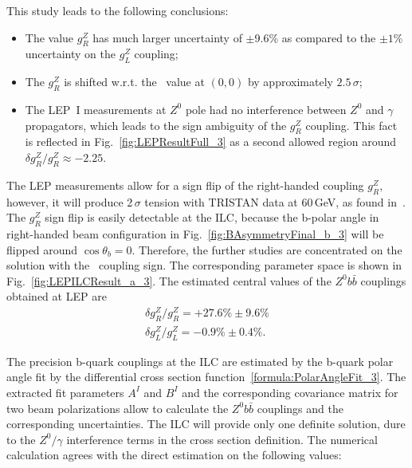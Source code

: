 This study leads to the following conclusions:
\begin{itemize}
	\item The value $g_R^Z$ has much larger uncertainty of $\pm$9.6\% as compared to the $\pm 1$\% uncertainty on the $g_L^Z$ coupling;
	\item The $g_R^Z$ is shifted w.r.t. the \sm\ value at $(0,0)$ by approximately $2.5\,\sigma$;
	\item The LEP~I measurements at $Z^0$ pole had no interference between $Z^0$ and $\gamma$ propagators, which leads to the sign ambiguity of the $g_R^Z$ coupling. This fact is reflected in Fig.~\ref{fig:LEPResultFull_3} as a second allowed region around $\delta g_R^Z / g_R^Z \approx -2.25$. 
\end{itemize}
The LEP measurements allow for a sign flip of the right-handed coupling $g_R^Z$, however, it will produce 2\,$\sigma$ tension with TRISTAN data at 60\,GeV, as found in~\cite{bib:LEPpuzzle}.
The $g_R^Z$ sign flip is easily detectable at the ILC, because the b-polar angle in right-handed beam configuration in Fig.~\ref{fig:BAsymmetryFinal_b_3} will be flipped around $\cos\theta_b = 0$. 
Therefore, the further studies are concentrated on the solution with the \sm\ coupling sign. 
The corresponding parameter space is shown in Fig.~\ref{fig:LEPILCResult_a_3}.
The estimated  central values of the $Z^0b\bar{b}$ couplings obtained at LEP are
\begin{eqnarray}
	\delta g_R^Z / g_R^Z = +27.6\% \pm 9.6\% \label{formula:LEPgR} \\
	\delta  g_L^Z / g_L^Z = -0.9\% \pm 0.4\%.
\end{eqnarray}


The precision b-quark couplings at the ILC are estimated by the b-quark polar angle fit by the differential cross section function~\ref{formula:PolarAngleFit_3}.
The extracted fit parameters $A^I$ and $B^I$ and the corresponding covariance matrix for two beam polarizations allow to calculate the $Z^0b\bar{b}$ couplings and the corresponding uncertainties. 
The ILC will provide only one definite solution, dure to the $Z^0/\gamma$ interference terms in the cross section definition. 
The numerical calculation agrees with the direct estimation on the following values:
\




